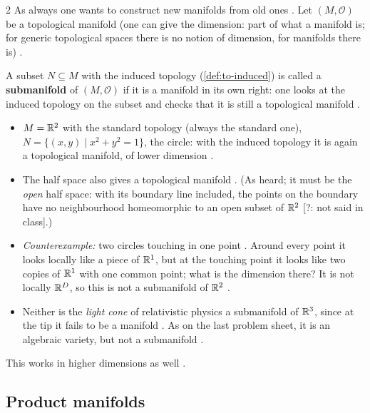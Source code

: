 \begin{paracol}{2}
As always one wants to construct new manifolds from old ones . Let $(M,\mathcal O)$ be a topological manifold (one can give the dimension: part of what a manifold is; for generic topological spaces there is no notion
of dimension, for manifolds there is) .
\begin{definition}\label{def:mf-sub}
A subset $N\subseteq M$ with the induced topology (\cref{def:to-induced}) is called a \textbf{submanifold} of $(M,\mathcal O)$ if it is a manifold in its own right: one looks at the induced topology on the subset and checks that it is still a topological manifold
.
\end{definition}
\begin{example}[Submanifolds of $\R^2$]\label{ex:mf-sub}
\begin{itemize}
  \item $M=\mathbb{R}^2$ with the standard topology (always the standard one), $N=\{(x,y)\mid x^2+y^2=1\}$, the circle: with the induced topology it is again a topological manifold, of lower dimension .
  \item The half space also gives a topological manifold . (As heard; it must be the \emph{open} half space: with its boundary line included, the points on the boundary have no neighbourhood homeomorphic to an open subset of $\R^2$ [?: not said in class].)
  \item \emph{Counterexample:} two circles touching in one point . Around every point it looks locally like a piece of $\mathbb{R}^1$, but at the touching point it looks like two copies of $\mathbb{R}^1$ with one common point; what is the dimension
        there? It is not locally $\mathbb{R}^D$, so this is not a submanifold of $\R^2$ .
  \item Neither is the \emph{light cone} of relativistic physics a submanifold of $\mathbb{R}^3$, since at the tip it fails to be a manifold . As on the last problem sheet, it is an algebraic variety, but not a submanifold .
\end{itemize}
This works in higher dimensions as well .
\end{example}

\subsection{Product manifolds}


\end{paracol}

